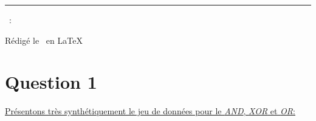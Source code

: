 \documentclass[a4paper,french,10pt]{article}
\begin{document}
	
	\title{\vspace{-1in}} %
	\author{} %
	\date{} %
	\maketitle %
	
	\usebox{\myReportTitle}
	\vspace{1in} %
	
	{\centering \huge \assignmentName \par}
	{\centering \noindent\rule{4in}{0.1pt} \par}
	\vspace{0.05in}
	{\centering \courseCode~: \courseName~ \par}
	{\centering Rédigé le \pubDate\ en \LaTeX \par}
	\vspace{1in}
	
	\tableofcontents
	\newpage
	
	
	\section{Question 1}
	
	\underline{Présentons très synthétiquement le jeu de données pour le \textit{AND}, \textit{XOR} et \textit{OR}:}
	
\end{document}
